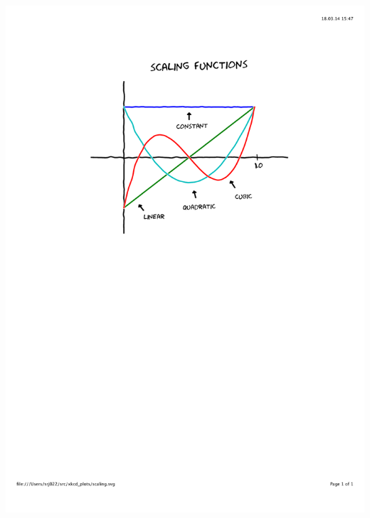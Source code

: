 \begin{frame}
\begin{columns}
\begin{column}[b]{0.35\linewidth}
{        \includegraphics[scale=0.4, clip, viewport=150 450 450 750] {figures/scaling.pdf}
        \vspace{3mm}
    }
\end{column}
\end{columns}
\end{frame}
